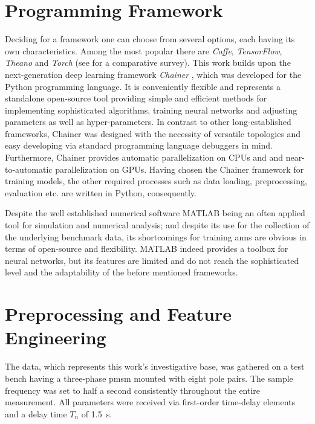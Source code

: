 \section{Programming Framework}
\label{sec:framework}
Deciding for a framework one can choose from several options, each having its own characteristics. 
Among the most popular there are \textit{Caffe}, \textit{TensorFlow}, \textit{Theano} and \textit{Torch} (see \cite{BaRa2015} for a comparative survey).
This work builds upon the next-generation deep learning framework \textit{Chainer} \cite{Chainer2015}, which was developed for the Python programming language.
It is conveniently flexible and represents a standalone open-source tool providing simple and efficient methods for implementing sophisticated algorithms, training neural networks and adjusting parameters as well as hyper-parameters.
In contrast to other long-established frameworks, Chainer was designed with the necessity of versatile topologies and easy developing via standard programming language debuggers in mind.
Furthermore, Chainer provides automatic parallelization on CPUs and and near-to-automatic parallelization on GPUs.
Having chosen the Chainer framework for training models, the other required processes such as data loading, preprocessing, evaluation etc. are written in Python, consequently. 

Despite the well established numerical software MATLAB being an often applied tool for simulation and numerical analysis; and despite its use for the collection of the underlying benchmark data, its shortcomings for training \glspl{ann} are obvious in terms of open-source and flexibility.
MATLAB indeed provides a toolbox for neural networks, but its features are limited and do not reach the sophisticated level and the adaptability of the before mentioned frameworks. 

\section{Preprocessing and Feature Engineering}
\label{sec:features}
The data, which represents this work's investigative base, was gathered on a test bench having a three-phase \gls{pmsm} mounted with eight pole pairs.
The sample frequency was set to half a second consistently throughout the entire measurement. 
All parameters were received via first-order time-delay elements and a delay time $T_n$ of \SI{1.5}{\second}.


